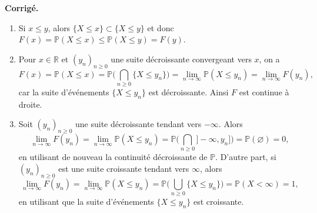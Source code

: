 \documentclass[a4paper,11pt]{article}
\newcommand{\R}{\mathbb{R}}
\renewcommand{\P}{\mathbb{P}}
\newcommand{\1}{\mathbbm{1}}
\newcommand{\DSB}[1]{{\color{DarkSlateBlue}#1}}
\theoremstyle{plain}
\theoremstyle{definition}
\newcounter{exo}
\newcommand{\separationexos}{
	\bigskip
}
\renewenvironment{comment}{\medskip\noindent \textcolor{BrickRed}{\textbf{Corrigé.}}}{}
\begin{document}
\begin{comment}
\begin{enumerate}
	\item Si $x \leq y$, alors $\{ X \leq x \} \subset \{X \leq y\}$ et donc $F(x) = \P(X \leq x) \leq \P(X \leq y) = F(y)$.
	\item Pour $x \in \R$ et $(y_n)_{n\geq0}$ une suite décroissante convergeant vers $x$, on a
	      \[
		      F(x)
		      = \P(X \leq x)
		      = \P \Biggl( \bigcap_{n\geq0} \{ X \leq y_n \} \Biggr)
		      = \lim_{n\to\infty} \P(X \leq y_n)
		      = \lim_{n\to\infty} F(y_n),
	      \]
	      car la suite d'événements $\{ X \leq y_n \}$ est décroissante. Ainsi $F$ est continue à droite.
	\item Soit $(y_n)_{n\geq0}$ une suite décroissante tendant vers $-\infty$. Alors
	      \[
		      \lim_{n\to\infty} F(y_n)
		      = \lim_{n\to\infty} \P(X \leq y_n)
		      = \P \Biggl( \bigcap_{n\geq0} ]-\infty,y_n] \Biggr)
		      = \P(\varnothing)
		      =0,
	      \]
	      en utilisant de nouveau la continuité décroissante de $\P$.
	      D'autre part, si $(y_n)_{n\geq0}$ est une suite croissante tendant vers $\infty$, alors
	      \[
		      \lim_{n\to\infty} F(y_n)
		      = \lim_{n\to\infty} \P(X \leq y_n)
		      = \P \Biggl( \bigcup_{n\geq0} \{ X \leq y_n \} \Biggr)
		      = \P(X < \infty)
		      = 1,
	      \]
	      en utilisant que la suite d'événements $\{ X \leq y_n \}$ est croissante.
\end{enumerate}
\end{comment}

\separationexos
\end{document}
